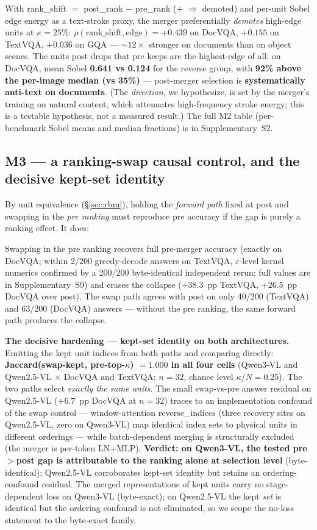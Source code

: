 \documentclass[journal]{IEEEtran}
\begin{document}
With rank\_shift $=$ post\_rank $-$ pre\_rank ($+$ $\Rightarrow$ demoted) and
per-unit Sobel edge energy as a text-stroke proxy, the merger preferentially
\emph{demotes} high-edge units at $\kappa = 25\%$: $\rho(\text{rank\_shift},
\text{edge}) = +0.439$ on DocVQA, $+0.155$ on TextVQA, $+0.036$ on GQA ---
${\sim}12\times$ stronger on documents than on object scenes. The units post
drops that pre keeps are the highest-edge of all: on DocVQA, mean Sobel
\textbf{0.641 vs 0.124} for the reverse group, with \textbf{92\% above the
per-image median (vs 35\%)} --- post-merger selection is \textbf{systematically
anti-text on documents}. (The \emph{direction}, we hypothesize, is set by the
merger's training on natural content, which attenuates high-frequency stroke
energy; this is a testable hypothesis, not a measured result.) The full M2 table
(per-benchmark Sobel means and median fractions) is in Supplementary~S2.

\subsection{M3 --- a ranking-swap causal control, and the decisive kept-set identity}\label{sec:m3}

By unit equivalence (\S\ref{sec:rbm}), holding the \emph{forward path} fixed at
post and swapping in the \emph{pre ranking} must reproduce pre accuracy if the
gap is purely a ranking effect. It does:

Swapping in the pre ranking recovers full pre-merger accuracy (exactly on
DocVQA; within 2/200 greedy-decode answers on TextVQA, $\varepsilon$-level
kernel numerics confirmed by a 200/200 byte-identical independent rerun; full
values are in Supplementary~S9) and
erases the collapse ($+38.3$~pp TextVQA, $+26.5$~pp DocVQA over post). The swap
path agrees with post on only 40/200 (TextVQA) and 63/200 (DocVQA) answers ---
without the pre ranking, the same forward path produces the collapse.

\textbf{The decisive hardening --- kept-set identity on both architectures.}
Emitting the kept unit indices from both paths and comparing directly:
\textbf{Jaccard(swap-kept, pre-top-$\kappa$) $= 1.000$ in all four cells}
(Qwen3-VL and Qwen2.5-VL $\times$ DocVQA and TextVQA; $n = 32$, chance level
$\kappa/N = 0.25$). The two paths select \emph{exactly the same units}. The
small swap-vs-pre answer residual on Qwen2.5-VL ($+6.7$~pp DocVQA at $n = 32$)
traces to an implementation confound of the swap control --- window-attention
reverse\_indices (three recovery sites on Qwen2.5-VL, zero on Qwen3-VL) map
identical index sets to physical units in different orderings --- while
batch-dependent merging is structurally excluded (the merger is per-token
LN+MLP). \textbf{Verdict: on Qwen3-VL, the tested pre$>$post gap is attributable
to the ranking alone at selection level} (byte-identical); Qwen2.5-VL
corroborates kept-set identity but retains an ordering-confound residual.
The merged representations of kept units carry no stage-dependent loss on
Qwen3-VL (byte-exact); on Qwen2.5-VL the kept \emph{set} is identical but the
ordering confound is not eliminated, so we scope the no-loss statement to the
byte-exact family.
\end{document}
